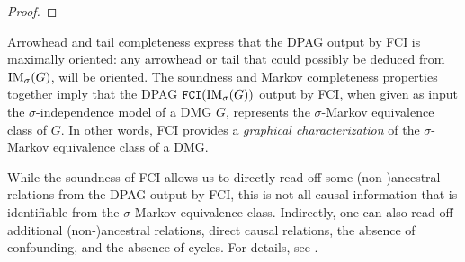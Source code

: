 \begin{proof}

\end{proof}
Arrowhead and tail completeness express that the DPAG output by FCI is maximally oriented: any arrowhead or tail that could possibly be deduced from $\mathrm{IM}_\sigma(G)$, will be oriented.
The soundness and Markov completeness properties together imply that the DPAG $\mathtt{FCI}(\mathrm{IM}_\sigma(G))$ output by FCI, when given as input the $\sigma$-independence model of a DMG $G$, represents the $\sigma$-Markov equivalence class of $G$.
In other words, FCI provides a \emph{graphical characterization} of the $\sigma$-Markov equivalence class of a DMG.

While the soundness of FCI allows us to directly read off some (non-)ancestral relations from the DPAG output by FCI, 
this is not all causal information that is identifiable from the $\sigma$-Markov equivalence class. 
Indirectly, one can also read off additional (non-)ancestral relations, direct causal relations, the absence of confounding, and the absence of cycles. 
For details, see \cite{MooijClaassen_UAI_20}.

